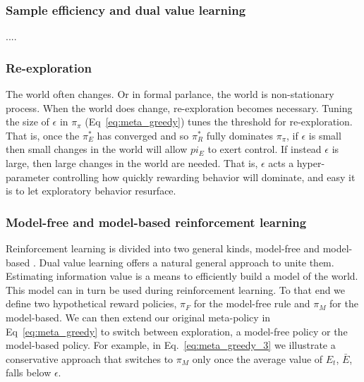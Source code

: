 \documentclass[9pt,twocolumn,twoside]{pnas-new}
\begin{document}
\subsubsection*{Sample efficiency and dual value learning}
....


\subsubsection*{Re-exploration}
The world often changes. Or in formal parlance, the world is non-stationary process. When the world does change, re-exploration becomes necessary. Tuning the size of $\epsilon$ in $\pi_{\pi}$ (Eq~\ref{eq:meta_greedy}) tunes the threshold for re-exploration. That is, once the $\pi^*_E$ has converged and so $\pi^*_R$ fully dominates $\pi_{\pi}$, if $\epsilon$ is small then small changes in the world will allow $pi_E$ to exert control. If instead $\epsilon$ is large, then large changes in the world are needed. That is, $\epsilon$ acts a hyper-parameter controlling how quickly rewarding behavior will dominate, and easy it is to let exploratory behavior resurface.

\subsubsection*{Model-free and model-based reinforcement learning}
Reinforcement learning is divided into two general kinds, model-free and model-based \cite{Sutton2018}. %
Dual value learning offers a natural general approach to unite them. Estimating information value is a means to efficiently build a model of the world. This model can in turn be used during reinforcement learning. To that end we define two hypothetical reward policies, $\pi_F$ for the model-free rule and $\pi_M$ for the model-based.  We can then extend our original meta-policy in Eq~\ref{eq:meta_greedy} to switch between exploration, a model-free policy or the model-based policy. For example, in Eq.~\ref{eq:meta_greedy_3} we illustrate a conservative approach that switches to $\pi_M$ only once the average value of $E_t$, $\bar E$, falls below $\epsilon$.
\end{document}
